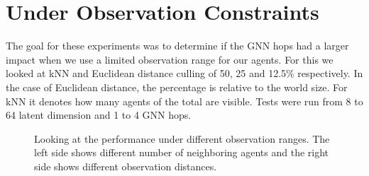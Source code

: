 \section{Under Observation Constraints}
\label{sec:Under Observation Constraints}
The goal for these experiments was to determine if the GNN hops had a larger impact when we use a limited observation range for our agents. For this we looked at kNN and Euclidean distance culling of 50, 25 and 12.5$\%$ respectively. In the case of Euclidean distance, the percentage is relative to the world size. For kNN it denotes how many agents of the total are visible. Tests were run from 8 to 64 latent dimension and 1 to 4 GNN hops.

\begin{figure}[htp]
    \centering
    \hspace{1cm}                       
    \caption{Looking at the performance under different observation ranges. The left side shows different number of neighboring agents and the right side shows different observation distances.}
    \label{fig:observation-knnvsdistance}
\end{figure}

